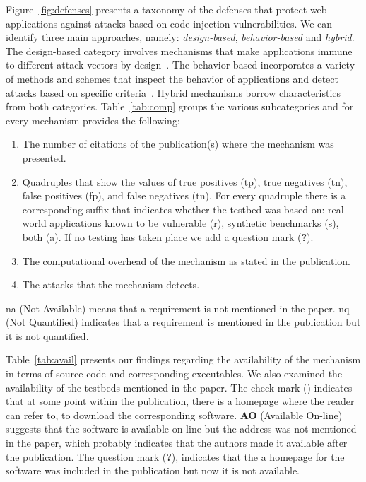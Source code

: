 \documentclass[conference]{IEEEtran}
\newcommand{\tick}{\ding{52}}
\begin{document}
Figure~\ref{fig:defenses} presents a taxonomy of the
defenses that protect web applications against attacks based on
code injection vulnerabilities.
We can identify three main approaches, namely:
{\it design-based}, {\it behavior-based}
and {\it hybrid}.
The design-based category involves mechanisms that make applications
immune to different attack vectors by design~\cite{JL75,L81}.
The behavior-based incorporates a variety of methods and
schemes that inspect the behavior of applications
and detect attacks based on specific criteria~\cite{D76,A00}.
Hybrid mechanisms borrow characteristics from both categories.
Table~\ref{tab:comp} groups the various subcategories
and for every mechanism provides the following:

\begin{enumerate}
\item The number of citations of the publication(s) where
the mechanism was presented.
\item Quadruples that show the values of true
positives ({\sc tp}), true negatives ({\sc tn}),
false positives ({\sc fp}), and false negatives
({\sc tn}). For every quadruple there is a corresponding
suffix that indicates whether the testbed was based
on: real-world applications known to be vulnerable
(r), synthetic benchmarks (s), both (a).
If no testing has taken place we add a question
mark ({\bf ?}).
\item The computational overhead of the
mechanism as stated in the publication.
\item The attacks that the mechanism detects.
\end{enumerate}

\noindent
{\sc na} (Not Available) means that a requirement is not
mentioned in the paper. {\sc nq} (Not Quantified)
indicates that a requirement is mentioned in the publication
but it is not quantified.

Table~\ref{tab:avail} presents
our findings regarding the availability of the mechanism
in terms of source code and corresponding executables.
We also examined the availability of the testbeds mentioned in the paper.
The check mark (\tick) indicates that at some point within the publication,
there is a homepage where the reader can refer to, to download the
corresponding software. {\bf AO} (Available On-line) suggests that
the software is available on-line but the address was not mentioned
in the paper, which probably indicates that the authors made
it available after the publication. The question mark ({\bf ?}),
indicates that the a homepage for the software was included
in the publication but now it is not available.
\end{document}
